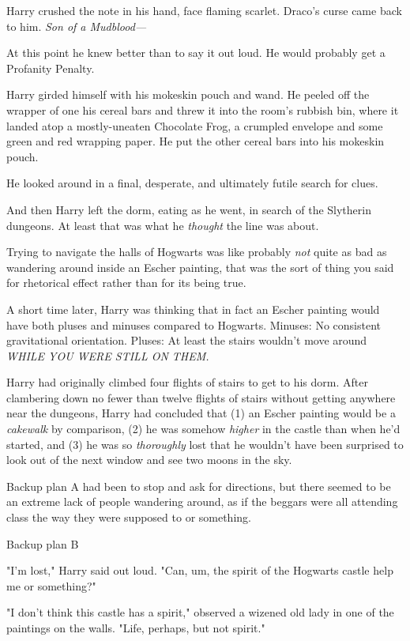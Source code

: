 Harry crushed the note in his hand, face flaming scarlet. Draco's curse came
back to him. \emph{Son of a Mudblood---}

At this point he knew better than to say it out loud. He would probably get a
Profanity Penalty.

Harry girded himself with his mokeskin pouch and wand. He peeled off the
wrapper of one his cereal bars and threw it into the room's rubbish bin, where
it landed atop a mostly-uneaten Chocolate Frog, a crumpled envelope and some
green and red wrapping paper. He put the other cereal bars into his mokeskin
pouch.

He looked around in a final, desperate, and ultimately futile search for clues.

And then Harry left the dorm, eating as he went, in search of the Slytherin
dungeons. At least that was what he \emph{thought} the line was about.

Trying to navigate the halls of Hogwarts was like{\el} probably \emph{not}
quite as bad as wandering around inside an Escher painting, that was the sort
of thing you said for rhetorical effect rather than for its being true.

A short time later, Harry was thinking that in fact an Escher painting would
have both pluses and minuses compared to Hogwarts. Minuses: No consistent
gravitational orientation. Pluses: At least the stairs wouldn't move
around \emph{WHILE YOU WERE STILL ON THEM.}

Harry had originally climbed four flights of stairs to get to his dorm. After
clambering down no fewer than twelve flights of stairs without getting anywhere
near the dungeons, Harry had concluded that (1) an Escher painting would be a
\emph{cakewalk} by comparison, (2) he was somehow \emph{higher} in the castle
than when he'd started, and (3) he was so \emph{thoroughly} lost that he
wouldn't have been surprised to look out of the next window and see two moons
in the sky.

Backup plan A had been to stop and ask for directions, but there seemed to be
an extreme lack of people wandering around, as if the beggars were all
attending class the way they were supposed to or something.

Backup plan B{\el}

"I'm lost," Harry said out loud. "Can, um, the spirit of the Hogwarts castle
help me or something?"

"I don't think this castle has a spirit," observed a wizened old lady in one of
the paintings on the walls. "Life, perhaps, but not spirit."

